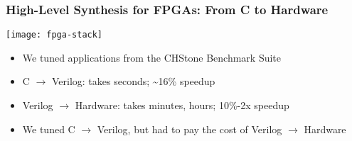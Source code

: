 \documentclass[10pt, compress, aspectratio=169, xcolor=table]{beamer}
\begin{document}
\begin{frame}
    \frametitle{High-Level Synthesis for FPGAs: From C to Hardware}
    \begin{center}
        \texttt{[image: fpga-stack]}
    \end{center}

    \begin{itemize}
        \item We tuned applications from the \alert{CHStone Benchmark Suite}
        \item C $\rightarrow$ Verilog: takes \alert{seconds}; \alert{\textasciitilde16\% speedup}
        \item Verilog $\rightarrow$ Hardware: takes \alert{minutes}, \alert{hours}; \alert{10\%-2x speedup}
        \item We tuned C $\rightarrow$ Verilog, but had \alert{to pay the cost} of Verilog $\rightarrow$ Hardware
    \end{itemize}
\end{frame}
\end{document}
